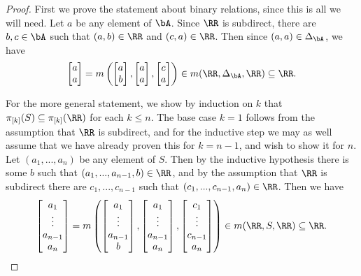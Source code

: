 \begin{proof} First we prove the statement about binary relations, since this is all we will need. Let $a$ be any element of $\bA$. Since $\RR$ is subdirect, there are $b, c \in \bA$ such that $(a,b) \in \RR$ and $(c,a) \in \RR$. Then since $(a,a) \in \Delta_{\bA}$, we have
\[
\begin{bmatrix} a\\ a \end{bmatrix} = m\left(\begin{bmatrix} a\\ b \end{bmatrix}, \begin{bmatrix} a\\ a \end{bmatrix}, \begin{bmatrix} c\\ a \end{bmatrix}\right) \in m(\RR,\Delta_{\bA},\RR) \subseteq \RR.
\]

For the more general statement, we show by induction on $k$ that $\pi_{[k]}(S) \subseteq \pi_{[k]}(\RR)$ for each $k \le n$. The base case $k = 1$ follows from the assumption that $\RR$ is subdirect, and for the inductive step we may as well assume that we have already proven this for $k = n-1$, and wish to show it for $n$. Let $(a_1, ..., a_n)$ be any element of $S$. Then by the inductive hypothesis there is some $b$ such that $(a_1,...,a_{n-1},b) \in \RR$, and by the assumption that $\RR$ is subdirect there are $c_1, ..., c_{n-1}$ such that $(c_1, ..., c_{n-1},a_n) \in \RR$. Then we have
\[
\begin{bmatrix} a_1\\ \vdots \\ a_{n-1} \\ a_n \end{bmatrix} = m\left(\begin{bmatrix} a_1 \\ \vdots \\ a_{n-1} \\ b \end{bmatrix}, \begin{bmatrix} a_1\\ \vdots \\ a_{n-1} \\ a_n \end{bmatrix}, \begin{bmatrix} c_1\\ \vdots \\ c_{n-1} \\ a_n \end{bmatrix}\right) \in m(\RR,S,\RR) \subseteq \RR.\qedhere
\]
\end{proof}

